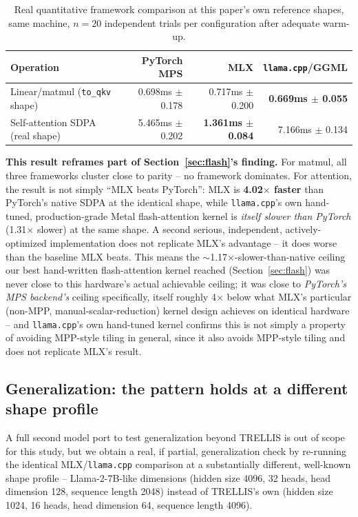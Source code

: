 \documentclass[11pt]{article}
\newcommand{\code}[1]{\texttt{#1}}
\begin{document}
\begin{table}[t]
    \centering
    \caption{Real quantitative framework comparison at this paper's own reference shapes, same
    machine, $n{=}20$ independent trials per configuration after adequate warm-up.}
    \label{tab:frameworks}
    \begin{tabular}{@{}lrrr@{}}
        \toprule
        Operation & PyTorch MPS & MLX & \code{llama.cpp}/GGML \\
        \midrule
        Linear/matmul (\code{to\_qkv} shape) & 0.698ms $\pm$ 0.178 & 0.717ms $\pm$ 0.200 & \textbf{0.669ms $\pm$ 0.055} \\
        Self-attention SDPA (real shape) & 5.465ms $\pm$ 0.202 & \textbf{1.361ms $\pm$ 0.084} & 7.166ms $\pm$ 0.134 \\
        \bottomrule
    \end{tabular}
\end{table}

\textbf{This result reframes part of Section~\ref{sec:flash}'s finding.} For matmul, all three
frameworks cluster close to parity -- no framework dominates.
For attention, the result is not simply ``MLX beats PyTorch'': MLX is \textbf{4.02$\times$
faster} than PyTorch's native SDPA at the identical shape, while \code{llama.cpp}'s own
hand-tuned, production-grade Metal flash-attention kernel is \emph{itself slower than PyTorch}
(1.31$\times$ slower) at the same shape. A second serious, independent, actively-optimized
implementation does not replicate MLX's advantage -- it does worse than the baseline MLX beats.
This means the $\sim$1.17$\times$-slower-than-native ceiling our best hand-written flash-attention
kernel reached (Section~\ref{sec:flash}) was never close to this hardware's actual achievable
ceiling; it was close to \emph{PyTorch's MPS backend's} ceiling specifically, itself roughly
4$\times$ below what MLX's particular (non-MPP, manual-scalar-reduction) kernel design achieves on
identical hardware -- and \code{llama.cpp}'s own hand-tuned kernel confirms this is not simply a
property of avoiding MPP-style tiling in general, since it also avoids MPP-style tiling and does
not replicate MLX's result.

\subsection{Generalization: the pattern holds at a different shape profile}
A full second model port to test generalization beyond TRELLIS is out of scope for this study, but
we obtain a real, if partial, generalization check by re-running the identical MLX/\code{llama.cpp}
comparison at a substantially different, well-known shape profile -- Llama-2-7B-like dimensions
(hidden size 4096, 32 heads, head dimension 128, sequence length 2048) instead of TRELLIS's own
(hidden size 1024, 16 heads, head dimension 64, sequence length 4096).
\end{document}
